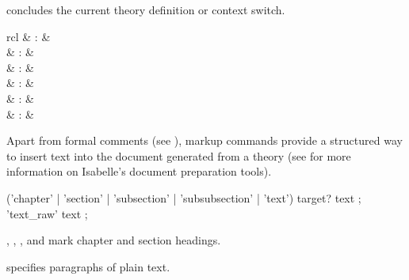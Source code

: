 \begin{isabellebody}
\begin{isamarkuptext}
\begin{descr}
  \item [\mbox{\isa{\isacommand{end}}}] concludes the current theory definition or
  context switch.

  \end{descr}%
\end{isamarkuptext}%
\isamarkuptrue%
%
\isamarkuptrue%
%
\begin{isamarkuptext}%
\begin{matharray}{rcl}
    \mbox{} & : &  \\
    \mbox{} & : &  \\
    \mbox{} & : &  \\
    \mbox{} & : &  \\
    \mbox{} & : &  \\
    \mbox{} & : &  \\
  \end{matharray}

  Apart from formal comments (see ), markup
  commands provide a structured way to insert text into the document
  generated from a theory (see \cite{isabelle-sys} for more
  information on Isabelle's document preparation tools).

  \begin{rail}
    ('chapter' | 'section' | 'subsection' | 'subsubsection' | 'text') target? text
    ;
    'text\_raw' text
    ;
  \end{rail}

  \begin{descr}

  \item [\mbox{\isa{\isacommand{chapter}}}, \mbox{\isa{\isacommand{section}}}, \mbox{\isa{\isacommand{subsection}}}, and \mbox{\isa{\isacommand{subsubsection}}}] mark chapter and
  section headings.

  \item [\mbox{\isa{\isacommand{text}}}] specifies paragraphs of plain text.


\end{descr}
\end{isamarkuptext}
\end{isabellebody}
